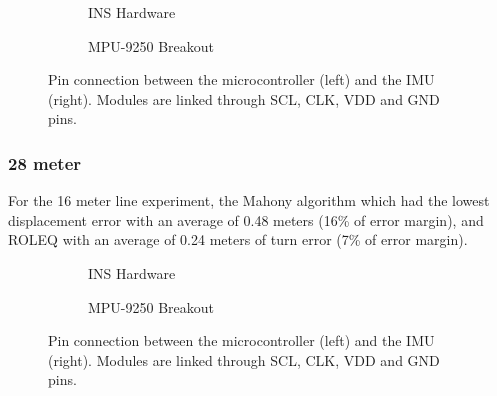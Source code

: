 \begin{figure}[!h]
    \centering
    \begin{subfigure}{0.49\textwidth}
        \centering
        \resizebox{1\linewidth}{!}{}
        \caption{INS Hardware}
        \label{fig:square162D}
    \end{subfigure}
    \begin{subfigure}{0.49\textwidth}
        \centering
        \resizebox{1\linewidth}{!}{}
        \caption{MPU-9250 Breakout}
        \label{fig:square163D}
    \end{subfigure}
    \caption{Pin connection between the microcontroller (left) and the IMU (right). Modules are linked through SCL, CLK, VDD and GND pins.}
    \label{fig:square16}
\end{figure}

\subsubsection{28 meter}

For the 16 meter line experiment, the Mahony algorithm which had the lowest displacement error with an average of 0.48 meters (16\% of error margin), and ROLEQ with an average of 0.24 meters of turn error (7\% of error margin).

\begin{figure}[!h]
    \centering
    
\end{figure}

\begin{figure}[!h]
    \centering
    \begin{subfigure}{0.49\textwidth}
        \centering
        \resizebox{1\linewidth}{!}{}
        \caption{INS Hardware}
        \label{fig:sub1}
    \end{subfigure}
    \begin{subfigure}{0.49\textwidth}
        \centering
        \resizebox{1\linewidth}{!}{}
        \caption{MPU-9250 Breakout}
        \label{fig:sub2}
    \end{subfigure}
    \caption{Pin connection between the microcontroller (left) and the IMU (right). Modules are linked through SCL, CLK, VDD and GND pins.}
    \label{fig:mag_calibration_output}
\end{figure}


